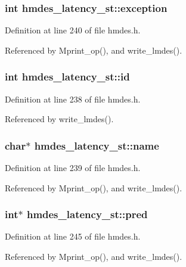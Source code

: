 \subsubsection{\setlength{\rightskip}{0pt plus 5cm}int \bf{hmdes\_\-latency\_\-st::exception}}\label{structhmdes__latency__st_9abed5d1517dc53232c021c69c20d1c2}




Definition at line 240 of file hmdes.h.

Referenced by Mprint\_\-op(), and write\_\-lmdes().
\subsubsection{\setlength{\rightskip}{0pt plus 5cm}int \bf{hmdes\_\-latency\_\-st::id}}\label{structhmdes__latency__st_034a0cc8c1d9d9d2bbc9e13297f5b7ec}




Definition at line 238 of file hmdes.h.

Referenced by write\_\-lmdes().
\subsubsection{\setlength{\rightskip}{0pt plus 5cm}char$\ast$ \bf{hmdes\_\-latency\_\-st::name}}\label{structhmdes__latency__st_4a4687a87bf5909e45c86f4a4cf27d2e}




Definition at line 239 of file hmdes.h.

Referenced by Mprint\_\-op(), and write\_\-lmdes().
\subsubsection{\setlength{\rightskip}{0pt plus 5cm}int$\ast$ \bf{hmdes\_\-latency\_\-st::pred}}\label{structhmdes__latency__st_17a40bd9a5638cc8a4ba5df27cdd9d77}




Definition at line 245 of file hmdes.h.

Referenced by Mprint\_\-op(), and write\_\-lmdes().
